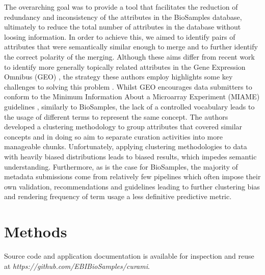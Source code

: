 \documentclass{bmcart}
\begin{document}
The overarching goal was to provide a tool that facilitates the reduction of redundancy and inconsistency of the attributes in the BioSamples database, ultimately to reduce the total number of attributes in the database without loosing information. In order to achieve this, we aimed to identify pairs of attributes that were semantically similar enough to merge and to further identify the correct polarity of the merging. Although these aims differ from recent work to identify more generally topically related attributes in the Gene Expression Omnibus (GEO) \cite{edgar2002gene, barrett2012ncbi}, the strategy these authors employ highlights some key challenges to solving this problem \cite{hu2017cleaning}. Whilst GEO encourages data submitters to conform to the Minimum Information About a Microarray Experiment (MIAME) guidelines \cite{brazma2001minimum}, similarly to BioSamples, the lack of a controlled vocabulary leads to the usage of different terms to represent the same concept. The authors developed a clustering methodology to group attributes that covered similar concepts and in doing so aim to separate curation activities into more manageable chunks. Unfortunately, applying clustering methodologies to data with heavily biased distributions leads to biased results, which impedes semantic understanding. Furthermore, as is the case for BioSamples, the majority of metadata submissions come from relatively few pipelines which often impose their own validation, recommendations and guidelines leading to further clustering bias and rendering frequency of term usage a less definitive predictive metric.


\section*{Methods}

Source code and application documentation is available for inspection and reuse at \textit{https://github.com/EBIBioSamples/curami}.
\end{document}
